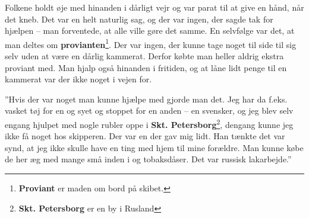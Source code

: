 Folkene holdt øje med hinanden i dårligt vejr og var parat til at give
en hånd, når det kneb. Det var en helt naturlig sag, og der var ingen,
der sagde tak for hjælpen -- man forventede, at alle ville gøre det
samme. En selvfølge var det, at man deltes om
\textbf{provianten}\footnote{\textbf{Proviant} er maden om bord på
  skibet.}. Der var ingen, der kunne tage noget til side til sig selv
uden at være en dårlig kammerat. Derfor købte man heller aldrig ekstra
proviant med. Man hjalp også hinanden i fritiden, og at låne lidt penge
til en kammerat var der ikke noget i vejen for.

''Hvis der var noget man kunne hjælpe med gjorde man det. Jeg har da
f.eks. vasket tøj for en og syet og stoppet for en anden -- en svensker,
og jeg blev selv engang hjulpet med nogle rubler oppe i \textbf{Skt.
Petersborg}\footnote{\textbf{Skt. Petersborg} er en by i Rusland},
dengang kunne jeg ikke få noget hos skipperen. Der var en der gav mig
lidt. Han tænkte det var synd, at jeg ikke skulle have en ting med hjem
til mine forældre. Man kunne købe de her æg med mange små inden i og
tobaksdåser. Det var russisk lakarbejde.''


